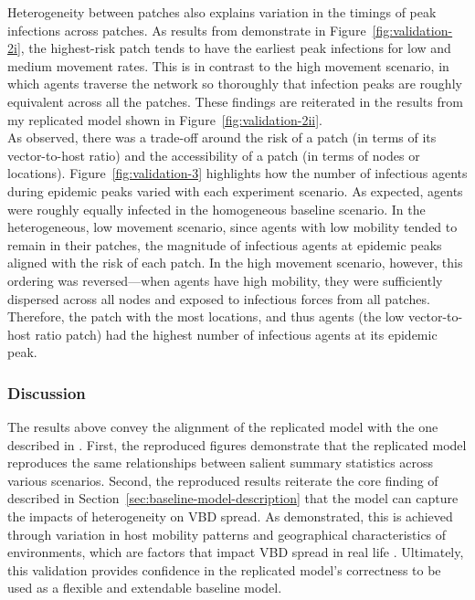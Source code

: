 Heterogeneity between patches also explains variation in the timings of peak infections across patches. As results from \citet{manore_network-patch_2015} demonstrate in Figure~\ref{fig:validation-2i}, the highest-risk patch tends to have the earliest peak infections for low and medium movement rates. This is in contrast to the high movement scenario, in which agents traverse the network so thoroughly that infection peaks are roughly equivalent across all the patches. These findings are reiterated in the results from my replicated model shown in Figure~\ref{fig:validation-2ii}.  \\

As \citet{manore_network-patch_2015} observed, there was a trade-off around the risk of a patch (in terms of its vector-to-host ratio) and the accessibility of a patch (in terms of nodes or locations). Figure~\ref{fig:validation-3} highlights how the number of infectious agents during epidemic peaks varied with each experiment scenario. As expected, agents were roughly equally infected in the homogeneous baseline scenario. In the heterogeneous, low movement scenario, since agents with low mobility tended to remain in their patches, the magnitude of infectious agents at epidemic peaks aligned with the risk of each patch. In the high movement scenario, however, this ordering was reversed---when agents have high mobility, they were sufficiently dispersed across all nodes and exposed to infectious forces from all patches. Therefore, the patch with the most locations, and thus agents (the low vector-to-host ratio patch) had the highest number of infectious agents at its epidemic peak.

\subsubsection{Discussion}

The results above convey the alignment of the replicated model with the one described in \citet{manore_network-patch_2015}. First, the reproduced figures demonstrate that the replicated model reproduces the same relationships between salient summary statistics across various scenarios. Second, the reproduced results reiterate the core finding of \citet{manore_network-patch_2015} described in Section~\ref{sec:baseline-model-description} that the model can capture the impacts of heterogeneity on VBD spread. As demonstrated, this is achieved through variation in host mobility patterns and geographical characteristics of environments, which are factors that impact VBD spread in real life \cite{musili_modeling_2024, pepey_mobility_2022}. Ultimately, this validation provides confidence in the replicated model's correctness to be used as a flexible and extendable baseline model.


